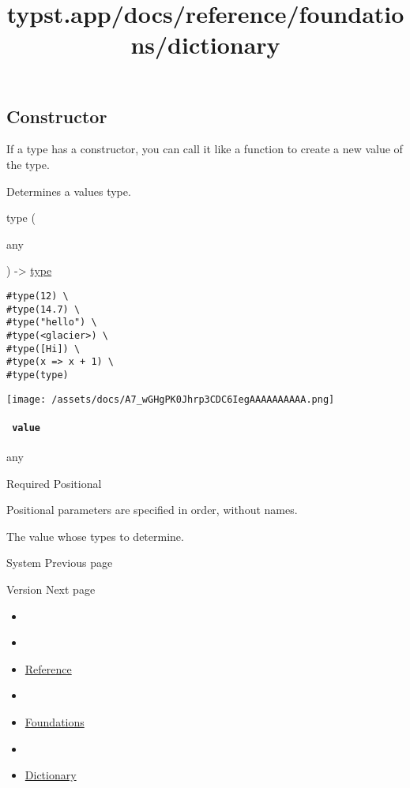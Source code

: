 \subsection{\texorpdfstring{Constructor
{}}{Constructor }}\label{constructor}

\label{constructor-constructor-tooltip}
If a type has a constructor, you can call it like a function to create a
new value of the type.

Determines a value\textquotesingle s type.

{ type } (

{ { any } }

) -\textgreater{} \href{/docs/reference/foundations/type/}{type}

\begin{verbatim}
#type(12) \
#type(14.7) \
#type("hello") \
#type(<glacier>) \
#type([Hi]) \
#type(x => x + 1) \
#type(type)
\end{verbatim}

\texttt{[image: /assets/docs/A7\_wGHgPK0Jhrp3CDC6IegAAAAAAAAAA.png]}

\paragraph{\texorpdfstring{\texttt{\ value\ }}{ value }}\label{constructor-value}

{ any }

{Required} {{ Positional }}

\phantomsection\label{constructor-value-positional-tooltip}
Positional parameters are specified in order, without names.

The value whose type\textquotesingle s to determine.

\href{/docs/reference/foundations/sys/}{\pandocbounded{}}

{ System } { Previous page }

\href{/docs/reference/foundations/version/}{\pandocbounded{}}

{ Version } { Next page }


\title{typst.app/docs/reference/foundations/dictionary}

\begin{itemize}
\tightlist
\item
  \href{/docs}{}
\item
  
\item
  \href{/docs/reference/}{Reference}
\item
  
\item
  \href{/docs/reference/foundations/}{Foundations}
\item
  
\item
  \href{/docs/reference/foundations/dictionary/}{Dictionary}
\end{itemize}

